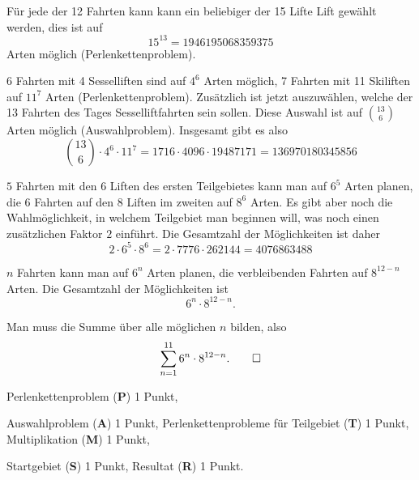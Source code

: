 
\begin{loesung}
\begin{teilaufgaben}
\item
Für jede der 12 Fahrten kann kann ein beliebiger der 15 Lifte Lift
gewählt werden, dies ist auf
\[
15^{13} = 1946195068359375
\]
Arten möglich
(Perlenkettenproblem).
\item
6 Fahrten mit 4 Sesselliften sind auf $4^6$ Arten möglich,
7 Fahrten mit 11 Skiliften auf $11^7$ Arten (Perlenkettenproblem).
Zusätzlich ist jetzt auszuwählen, welche der 13 Fahrten
des Tages Sesselliftfahrten sein sollen.
Diese Auswahl ist auf $\binom{13}{6}$ Arten möglich (Auswahlproblem).
Insgesamt gibt es also
\[
\binom{13}{6}\cdot 4^6\cdot 11^7
=
1716\cdot 4096 \cdot 19487171
=
136970180345856
\]
\item
$5$ Fahrten mit den $6$ Liften des ersten Teilgebietes kann man auf
$6^5$ Arten planen, die $6$ Fahrten auf den $8$ Liften im zweiten auf
$8^6$ Arten.
Es gibt aber noch die Wahlmöglichkeit, in welchem Teilgebiet man 
beginnen will, was noch einen zusätzlichen Faktor $2$ einführt.
Die Gesamtzahl der Möglichkeiten ist daher
\[
2\cdot 6^5\cdot 8^6
=
2\cdot 7776\cdot 262144
=
4076863488
\]
\item
$n$ Fahrten kann man auf $6^n$ Arten planen, die verbleibenden Fahrten
auf $8^{12-n}$ Arten.
Die Gesamtzahl der Möglichkeiten ist
\[
6^n\cdot 8^{12-n}.
\]
\item
Man muss die Summe über alle möglichen $n$ bilden, also
\[
\sum_{n=1}^{11} 6^n \cdot 8^{12-n}.
\qedhere
\]
\end{teilaufgaben}
\end{loesung}

\begin{bewertung}
\begin{teilaufgaben}
\item Perlenkettenproblem ({\bf P}) 1 Punkt,
\item Auswahlproblem ({\bf A}) 1 Punkt,
Perlenkettenprobleme für Teilgebiet ({\bf T}) 1 Punkt,
Multiplikation ({\bf M}) 1 Punkt,
\item
Startgebiet ({\bf S}) 1 Punkt,
Resultat ({\bf R}) 1 Punkt.
\end{teilaufgaben} 
\end{bewertung}
